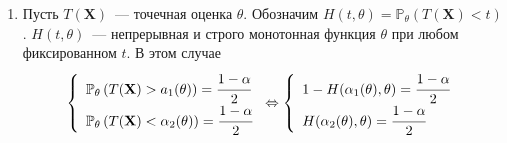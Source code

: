 \documentclass[oneside,final,14pt]{extreport}
\theoremstyle{definition}
\begin{document}
\begin{enumerate}
    \item Пусть $T(\mathbf{X})$~--- точечная оценка $\theta$. Обозначим $H(t, \theta)=\mathbb{P}_{\theta}(T(\mathbf{X})<t)$. $H(t,\theta)$~--- непрерывная и строго монотонная функция $\theta$ при любом фиксированном $t$. В этом случае
    \begin{equation*}
        \left\{\begin{array}{l}
            \mathbb{P}_{\theta}\left(T(\mathbf{X})>a_{1}(\theta)\right)
            = \cfrac{1-\alpha}{2} \\ 
            \mathbb{P}_{\theta}\left(T(\mathbf{X})<\alpha_{2}(\theta)\right)
            = \cfrac{1-\alpha}{2}
        \end{array}\right. 
        \Leftrightarrow 
        \left\{\begin{array}{l}
            1 - H(\alpha_{1}(\theta), \theta)=\cfrac{1-\alpha}{2} \\ 
            H(\alpha_{2}(\theta), \theta)=\cfrac{1-\alpha}{2}
        \end{array}\right.
    \end{equation*}
    

\end{enumerate}
\end{document}
